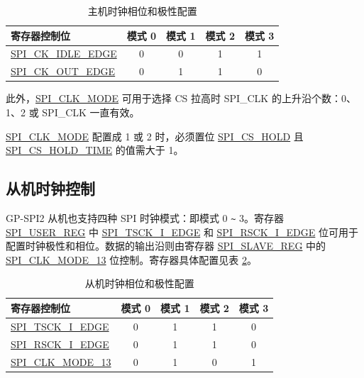 \documentclass[main\_\_CN.tex]{subfiles}
\begin{document}
\begin{table}[H]
    \centering
    \caption{主机时钟相位和极性配置}
    \label{table:clock_pol_master}
    \begin{tabular}[c]{|p{3.5cm}|c|c|c|c|}
    \hline
    \rowcolor{lightgray}
    寄存器控制位 & 模式 0 & 模式 1 & 模式 2 & 模式 3\\
    \hline
   \hyperref[fielddesc:SPICKIDLEEDGE]{SPI\_CK\_IDLE\_EDGE}  & 0     & 0     & 1     & 1\\
    \hline
   \hyperref[fielddesc:SPICKOUTEDGE]{SPI\_CK\_OUT\_EDGE}   & 0     & 1     & 1     & 0\\
    \hline
    \end{tabular}
\end{table}

此外，\hyperref[fielddesc:SPICLKMODE]{SPI\_CLK\_MODE} 可用于选择 CS 拉高时 SPI\_CLK 的上升沿个数：0、1、2 或 SPI\_CLK 一直有效。 

\begin{tiplisting}
 \hyperref[fielddesc:SPICLKMODE]{SPI\_CLK\_MODE} 配置成 1 或 2 时，必须置位 \hyperref[fielddesc:SPICSHOLD]{SPI\_CS\_HOLD} 且 \hyperref[fielddesc:SPICSHOLDTIME]{SPI\_CS\_HOLD\_TIME} 的值需大于 1。
\end{tiplisting}
\vspace{-1em}

\subsection{从机时钟控制}\label{GP-SPI2 slave clock control}

GP-SPI2 从机也支持四种 SPI 时钟模式：即模式 0 \verb+~+ 3。寄存器 \hyperref[regdesc:SPIUSERREG]{SPI\_USER\_REG} 中 \hyperref[fielddesc:SPITSCKIEDGE]{SPI\_TSCK\_I\_EDGE} 和 \hyperref[fielddesc:SPIRSCKIEDGE]{SPI\_RSCK\_I\_EDGE} 位可用于配置时钟极性和相位。数据的输出沿则由寄存器 \hyperref[regdesc:SPISLAVEREG]{SPI\_SLAVE\_REG} 中的 \hyperref[fielddesc:SPICLKMODE13]{SPI\_CLK\_MODE\_13} 位控制。寄存器具体配置见表  \ref{table:clock_pol_slave}。 

\begin{table}[H]
    \centering
    \caption{从机时钟相位和极性配置}
    \label{table:clock_pol_slave}
    \begin{tabular}[c]{|p{3.5cm}|c|c|c|c|}
    \hline
    \rowcolor{lightgray}
    寄存器控制位 & 模式 0 & 模式 1 & 模式 2 & 模式 3\\
    \hline
   \hyperref[fielddesc:SPITSCKIEDGE]{SPI\_TSCK\_I\_EDGE}   & 0 & 1 & 1 & 0\\
    \hline
   \hyperref[fielddesc:SPIRSCKIEDGE]{SPI\_RSCK\_I\_EDGE}   & 0 & 1 & 1 & 0\\
    \hline
   \hyperref[fielddesc:SPICLKMODE13]{SPI\_CLK\_MODE\_13}     & 0 & 1 & 0 & 1\\
    \hline    
    \end{tabular}
\end{table}
\end{document}
